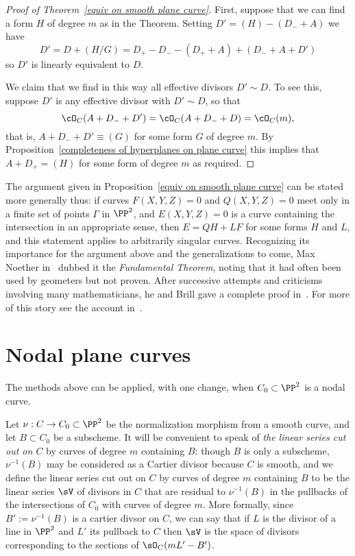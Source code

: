 \begin{proof}[Proof of Theorem~\ref{equiv on smooth plane curve}]
First, suppose that we can find a form $H$ of degree $m$ as in the Theorem.
Setting $D' = (H) -(D_{-}+A)$ we have
$$
D' = D + (H/G) = D_{+}- D_{-} - (D_{+}+A)+(D_{-}+A+D')
$$
so $D'$ is linearly equivalent to $D$. 

We claim that we find in this way all effective divisors $D' \sim D$. 
To see this, suppose $D'$ is any effective divisor with $D' \sim D$, so that
$$
\cO_C(A+D_{-}+D') = \cO_C(A+D_{-}+D)  = \cO_C(m),
$$
that is, $A+D_{-}+D' \equiv (G)$ for some form $G$ of degree $m$. By Proposition~\ref{completeness of hyperplanes on plane curve}
this implies that $A+D_{+} = (H)$ for some form of degree $m$ as required.
\end{proof}


The argument given in Proposition~\ref{equiv on smooth plane curve} can be stated more generally thus:  if curves $F(X,Y,Z)=0$ and $Q(X,Y,Z)=0$ 
meet only in a finite set of points $\Gamma$ in $\PP^{2}$, and $E(X,Y,Z) = 0$ is a curve containing the intersection in an appropriate sense,
then $E = QH +LF$ for some forms $H$ and $L$, and this statement applies to arbitrarily singular curves. Recognizing its importance for the argument above and the generalizations to come, Max Noether in~\cite{Noether1873} dubbed it the \emph{Fundamental Theorem}, 
noting that it had often been used by geometers but not proven. After successive attempts and 
criticisms involving many mathematicians, he and Brill gave a complete proof in~\cite{Brill-Noether}. For more of this story see the account in~\cite{Eisenbud-Gray}.



\section{Nodal plane curves}\label{nodal curves section}

The methods above can be applied, with one change, when $C_{0}\subset \PP^{2}$
is a nodal curve. 

Let $\nu: C\to C_{0}\subset \PP^{2}$ be the normalization morphism from a smooth curve,
and let $B\subset C_{0}$ be a subscheme.
It will be convenient to speak of \emph{the linear series cut out on $C$} by curves of degree $m$
containing $B$: though $B$ is only a subscheme, $\nu^{-1}(B)$ may be considered as a Cartier divisor because
$C$ is smooth, and we define
the linear series cut out on $C$ by curves of degree $m$
containing $B$ to be
the linear series  $\sV$ of divisors in $C$ that are residual to $\nu^{-1}(B)$ in the pullbacks 
of the intersections of $C_{0}$ with curves of degree $m$. More formally, since $B' := \nu^{-1}(B)$
is a cartier divsor on $C$, we can say that if $L$ is the divisor of a line in $\PP^{2}$ and $L'$
its pullback to $C$ then
$\sV$ is the space of divisors corresponding to the
sections of $\sO_{C}(mL'-B')$.

